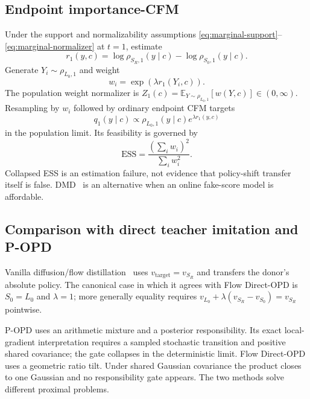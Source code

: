 \documentclass[11pt,a4paper]{article}
\newcommand{\E}{\mathbb{E}}
\newcommand{\Sbase}{S_0}
\newcommand{\Srl}{S_R}
\newcommand{\Lbase}{L_0}
\theoremstyle{plain}
\theoremstyle{definition}
\begin{document}
\subsection{Endpoint importance-CFM}

Under the support and normalizability assumptions
\eqref{eq:marginal-support}--\eqref{eq:marginal-normalizer} at $t=1$, estimate
\begin{equation}
r_1(y,c)
=
\log\rho_{\Srl,1}(y\mid c)
-\log\rho_{\Sbase,1}(y\mid c).
\label{eq:endpoint-reward}
\end{equation}
Generate $Y_i\sim\rho_{\Lbase,1}$ and weight
\begin{equation}
w_i=\exp(\lambda r_1(Y_i,c)).
\label{eq:endpoint-weights}
\end{equation}
The population weight normalizer is
$Z_1(c)=\E_{Y\sim\rho_{\Lbase,1}}[w(Y,c)]\in(0,\infty)$.
Resampling by $w_i$ followed by ordinary endpoint CFM targets
\begin{equation}
q_1(y\mid c)
\propto
\rho_{\Lbase,1}(y\mid c)e^{\lambda r_1(y,c)}
\label{eq:endpoint-target}
\end{equation}
in the population limit.  Its feasibility is governed by
\begin{equation}
\mathrm{ESS}
=
\frac{(\sum_iw_i)^2}{\sum_iw_i^2}.
\label{eq:ess}
\end{equation}
Collapsed ESS is an estimation failure, not evidence that policy-shift transfer itself is false.
DMD~\cite{dmd} is an alternative when an online fake-score model is affordable.

\subsection{Comparison with direct teacher imitation and P-OPD}

Vanilla diffusion/flow distillation~\cite{diffusionopd} uses
$v_{\mathrm{target}}=v_{\Srl}$ and transfers the donor's absolute policy.  The canonical case in
which it agrees with Flow Direct-OPD is $\Sbase=\Lbase$ and $\lambda=1$; more generally equality
requires
$v_{\Lbase}+\lambda(v_{\Srl}-v_{\Sbase})=v_{\Srl}$
pointwise.

P-OPD uses an arithmetic mixture and a posterior responsibility.  Its exact local-gradient
interpretation requires a sampled stochastic transition and positive shared covariance; the gate
collapses in the deterministic limit.  Flow Direct-OPD uses a geometric ratio tilt.  Under shared
Gaussian covariance the product closes to one Gaussian and no responsibility gate appears.  The
two methods solve different proximal problems.
\end{document}
